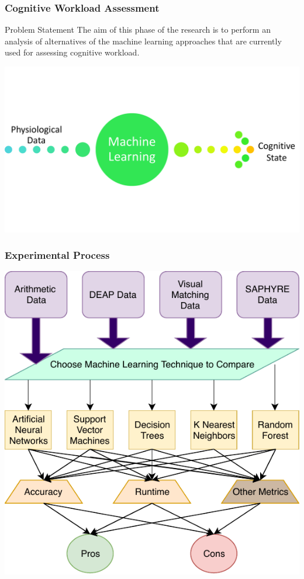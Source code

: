 \documentclass{beamer}
\begin{document}
\begin{frame}
\frametitle{Cognitive Workload Assessment}
\begin{block}{Problem Statement}
{The aim of this phase of the research is to perform an analysis of alternatives of the machine learning approaches that are currently used for assessing cognitive workload.}
\end{block}
\begin{center}
\includegraphics[width=.9\textwidth]{cw}
\end{center}
\end{frame}

\begin{frame}
\frametitle{Experimental Process}
\begin{center}
\includegraphics[width=.65\textwidth]{exp-fig}
\end{center}
\end{frame}
\end{document}
